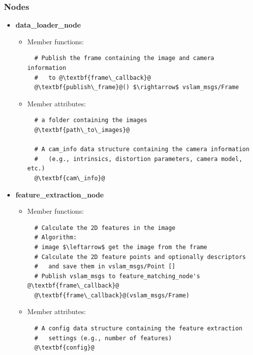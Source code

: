 \subsubsection{Nodes}

\begin{itemize}
  \item \textbf{data\_loader\_node}
  \begin{itemize}
    \item Member functions:
\begin{lstlisting}
  # Publish the frame containing the image and camera information
  #   to @\textbf{frame\_callback}@
  @\textbf{publish\_frame}@() $\rightarrow$ vslam_msgs/Frame
\end{lstlisting}

    \item Member attributes:
\begin{lstlisting}
  # a folder containing the images
  @\textbf{path\_to\_images}@ 
    
  # A cam_info data structure containing the camera information 
  #   (e.g., intrinsics, distortion parameters, camera model, etc.)
  @\textbf{cam\_info}@
\end{lstlisting}
  \end{itemize}  
  
  \item \textbf{feature\_extraction\_node}
  \begin{itemize}
    \item Member functions:
\begin{lstlisting}
  # Calculate the 2D features in the image
  # Algorithm:
  # image $\leftarrow$ get the image from the frame
  # Calculate the 2D feature points and optionally descriptors
  #   and save them in vslam_msgs/Point []
  # Publish vslam_msgs to feature_matching_node's @\textbf{frame\_callback}@
  @\textbf{frame\_callback}@(vslam_msgs/Frame) 
\end{lstlisting}

    \item Member attributes:
\begin{lstlisting}
  # A config data structure containing the feature extraction 
  #   settings (e.g., number of features)
  @\textbf{config}@
\end{lstlisting}
  \end{itemize}  



\end{itemize}
